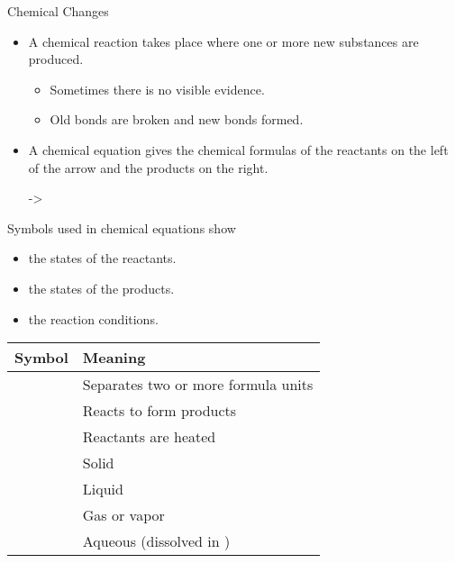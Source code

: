 \documentclass[11pt,letterpaper]{article}
\begin{document}

\begin{frame}[allowframebreaks]{Chemical Changes}
	\begin{itemize}
		\item A \alert{chemical reaction} takes place where one or
			more new substances are produced.
			\begin{itemize}
				\item Sometimes there is no visible evidence.
				\item Old bonds are broken and new bonds formed.
			\end{itemize}
		\item A \alert{chemical equation} gives the chemical formulas of
			the \alert{reactants} on the left of the arrow and the
			\alert{products} on the right.
			\begin{reaction*}
				 -> 
			\end{reaction*}
	\end{itemize}
	
	\framebreak

	Symbols used in chemical equations show
	\begin{itemize}
		\item the states of the reactants.
		\item the states of the products.
		\item the reaction conditions.
	\end{itemize}

	\bigskip

	\begin{center}
		\begin{tabular} {c l}
			\toprule
			\bfseries
			Symbol & \bfseries Meaning \\
			\midrule
			\ch{+} & Separates two or more formula units \\
			\ch{->} & Reacts to form products \\
			\ch{->[$\Delta$]} & Reactants are heated \\
			\ch{\sld} & Solid \\
			\ch{\lqd} & Liquid \\
			\ch{\gas} & Gas or vapor \\
			\ch{\aq} & Aqueous (dissolved in \ch{H2O}) \\
			\bottomrule
		\end{tabular}
	\end{center}
\end{frame}
\end{document}
